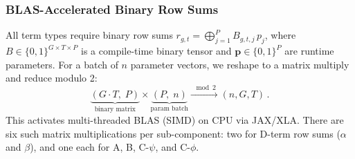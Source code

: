 \documentclass[a4paper,onecolumn,11pt,accepted=2026-06-10]{quantumarticle}
\begin{document}
\begin{table}[t]
\centering
\small
\caption{Sampling throughput for the $d=3$ cultivation circuit ($N\!=\!5$,
$M\!=\!32$, $K\!=\!2$, batch size $65{,}536$) on Apple M4 Pro series CPU at
$p = 0.001$ with $2^{26}$ shots. All methods are exact.}
\label{tab:throughput}
\end{table}

\subsubsection{BLAS-Accelerated Binary Row Sums}
\label{sec:blas}

All term types require binary row sums $\displaystyle r_{g,t} = \bigoplus_{j=1}^{P} B_{g,t,j}\, p_j$, where $B \in \{0,1\}^{G \times T \times P}$ is a compile-time binary tensor and $\mathbf{p} \in \{0,1\}^P$ are runtime parameters. For a batch of $n$ parameter vectors, we reshape to a matrix multiply and reduce modulo 2:
\begin{equation}
    \underbrace{(G \!\cdot\! T,\; P)}_{\text{binary matrix}}
    \times
    \underbrace{(P,\; n)}_{\text{param batch}}
    \xrightarrow{\;\bmod 2\;}
    (n, G, T)\,.
\end{equation}
This activates multi-threaded BLAS (SIMD) on CPU via JAX/XLA. There are six such matrix multiplications per sub-component: two for D-term row sums ($\alpha$ and $\beta$), and one each for A, B, C-$\psi$, and C-$\phi$.
\end{document}
